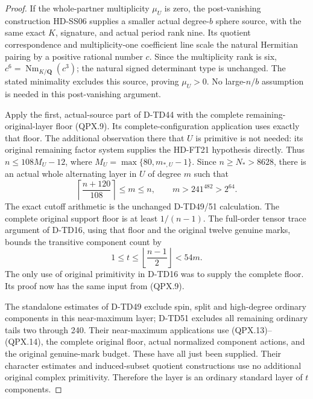 \begin{proof}
If the whole-partner multiplicity \(\mu_U\) is zero,
the post-vanishing construction HD-SS06 supplies a
smaller actual degree-\(b\) sphere source, with the same
exact \(K\), signature, and actual period rank nine.
Its quotient correspondence and multiplicity-one
coefficient line scale the natural Hermitian pairing
by a positive rational number \(c\). Since the
multiplicity rank is six, \(c^6=\operatorname{Nm}_{K/\mathbf Q}(c^3)\);
the natural signed determinant type is unchanged.
The stated minimality excludes this source, proving
\(\mu_U>0\). No large-\(n/b\) assumption is needed in
this post-vanishing argument.

Apply the first, actual-source part of D-TD44 with
the complete remaining-original-layer floor (QPX.9).
Its complete-configuration application uses exactly
that floor. The additional observation there that \(U\)
is primitive is not needed: its original remaining
factor system supplies the HD-FT21 hypothesis directly.
Thus \(n\le108M_U-12\), where
\(M_U=\max\{80,m_{*,U}-1\}\). Since \(n\ge N_*>8628\),
there is an actual whole alternating layer in \(U\)
of degree \(m\) such that
\[
 \left\lceil\frac{n+120}{108}\right\rceil\le m\le n,
 \qquad m>241^{482}>2^{64}.
 \tag{QPX.13}
\]
The exact cutoff arithmetic is the unchanged D-TD49/51
calculation. The complete original support floor is at
least \(1/(n-1)\). The full-order tensor trace argument
of D-TD16, using that floor and the original twelve
genuine marks, bounds the transitive component count by
\[
       1\le t\le\left\lfloor\frac{n-1}{2}\right\rfloor<54m.
 \tag{QPX.14}
\]
The only use of original primitivity in D-TD16 was to
supply the complete floor. Its proof now has the same
input from (QPX.9).

The standalone estimates of D-TD49 exclude spin,
split and high-degree ordinary components in this
near-maximum layer; D-TD51 excludes all remaining
ordinary tails two through 240. Their near-maximum
applications use (QPX.13)--(QPX.14), the complete
original floor, actual normalized component actions,
and the original genuine-mark budget. These have all
just been supplied. Their character estimates and
induced-subset quotient constructions use no additional
original complex primitivity. Therefore the layer is
an ordinary standard layer of \(t\) components.


\end{proof}
